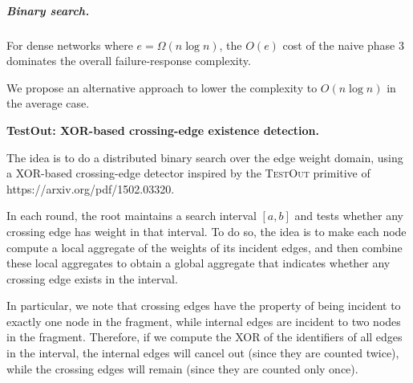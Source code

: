 \documentclass{memoir}
\begin{document}
\subparagraph{Binary search.}

For dense networks where $e = \Omega(n\log n)$, the $O(e)$ cost of the naive phase 3
dominates the overall failure-response complexity.

We propose an alternative approach to lower the complexity to $O(n\log n)$ in the average
case.

\noindent\textbf{TestOut: XOR-based crossing-edge existence detection.}

The idea is to do a distributed binary search over the edge weight domain, using a
XOR-based crossing-edge detector inspired by the \textsc{TestOut} primitive of
https://arxiv.org/pdf/1502.03320. %

In each round, the root maintains a search interval $[a,b]$ and tests whether any crossing
edge has weight in that interval. To do so, the idea is to make each node compute a local
aggregate of the weights of its incident edges, and then combine these local aggregates to
obtain a global aggregate that indicates whether any crossing edge exists in the interval.

In particular, we note that crossing edges have the property of being incident to exactly
one node in the fragment, while internal edges are incident to two nodes in the fragment.
Therefore, if we compute the XOR of the identifiers of all edges in the interval, the
internal edges will cancel out (since they are counted twice), while the crossing edges
will remain (since they are counted only once).

\end{document}
